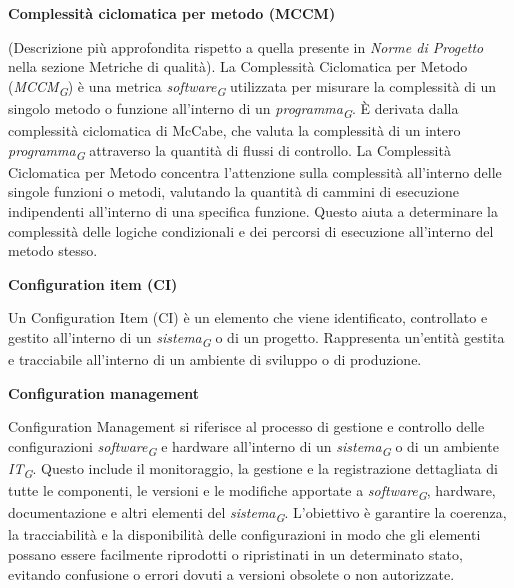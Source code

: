 \documentclass{article}
\begin{document}
\vspace{0.4cm}

\textbf{Complessità ciclomatica per metodo (MCCM)}

\vspace{0.1cm}

(Descrizione più approfondita rispetto a quella presente in \textit{Norme di Progetto} nella sezione Metriche di qualità). La Complessità Ciclomatica per Metodo (\textit{MCCM}\textsubscript{\textit{G}}) è una metrica \textit{software}\textsubscript{\textit{G}} utilizzata per misurare la complessità di un singolo metodo o funzione all'interno di un \textit{programma}\textsubscript{\textit{G}}. È derivata dalla complessità ciclomatica di McCabe, che valuta la complessità di un intero \textit{programma}\textsubscript{\textit{G}} attraverso la quantità di flussi di controllo.
La Complessità Ciclomatica per Metodo concentra l'attenzione sulla complessità all'interno delle singole funzioni o metodi, valutando la quantità di cammini di esecuzione indipendenti all'interno di una specifica funzione. Questo aiuta a determinare la complessità delle logiche condizionali e dei percorsi di esecuzione all'interno del metodo stesso.

\vspace{0.4cm}

\textbf{Configuration item (CI)}

\vspace{0.1cm}

Un Configuration Item (CI) è un elemento che viene identificato, controllato e gestito all'interno di un \textit{sistema}\textsubscript{\textit{G}} o di un progetto. Rappresenta un'entità gestita e tracciabile all'interno di un ambiente di sviluppo o di produzione.

\vspace{0.4cm}

\textbf{Configuration management}

\vspace{0.1cm}

Configuration Management si riferisce al processo di gestione e controllo delle configurazioni \textit{software}\textsubscript{\textit{G}} e hardware all'interno di un \textit{sistema}\textsubscript{\textit{G}} o di un ambiente \textit{IT}\textsubscript{\textit{G}}. Questo include il monitoraggio, la gestione e la registrazione dettagliata di tutte le componenti, le versioni e le modifiche apportate a \textit{software}\textsubscript{\textit{G}}, hardware, documentazione e altri elementi del \textit{sistema}\textsubscript{\textit{G}}. L'obiettivo è garantire la coerenza, la tracciabilità e la disponibilità delle configurazioni in modo che gli elementi possano essere facilmente riprodotti o ripristinati in un determinato stato, evitando confusione o errori dovuti a versioni obsolete o non autorizzate.
\end{document}
